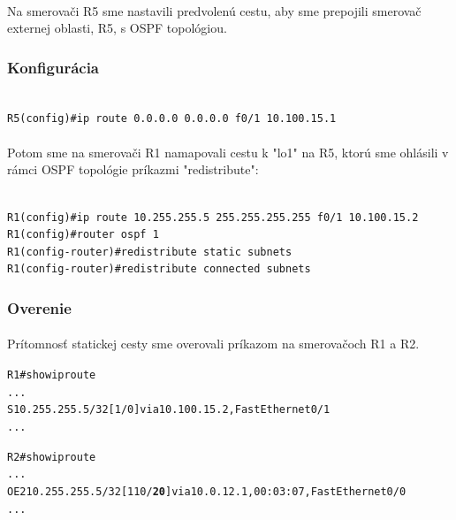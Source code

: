 \documentclass[12pt,twoside,a4paper]{report}
\begin{document}
\paragraph{}
Na smerovači R5 sme nastavili predvolenú cestu, aby sme prepojili smerovač externej oblasti, R5, s OSPF topológiou.

\subsubsection{Konfigurácia}
\noindent
{\selectfont
\begin{small}
\begin{verbatim}

R5(config)#ip route 0.0.0.0 0.0.0.0 f0/1 10.100.15.1

\end{verbatim}
\end{small}
}

\paragraph{}
Potom sme na smerovači R1 namapovali cestu k "lo1" na R5, ktorú sme ohlásili v rámci OSPF topológie príkazmi "redistribute":

\noindent
{\selectfont
\begin{small}
\begin{verbatim}

R1(config)#ip route 10.255.255.5 255.255.255.255 f0/1 10.100.15.2
R1(config)#router ospf 1
R1(config-router)#redistribute static subnets
R1(config-router)#redistribute connected subnets

\end{verbatim}
\end{small}
}

\subsubsection{Overenie}
\paragraph{}
Prítomnosť statickej cesty sme overovali príkazom  na smerovačoch R1 a R2.

\noindent
{\selectfont
\begin{small}
\begin{alltt}

R1#show ip route
...
S       10.255.255.5/32 [1/0] via 10.100.15.2, FastEthernet0/1
...




R2#show ip route
...
O E2    10.255.255.5/32 [110/\textbf{20}] via 10.0.12.1, 00:03:07, FastEthernet0/0
...
\end{alltt}
\end{small}
}
\end{document}
